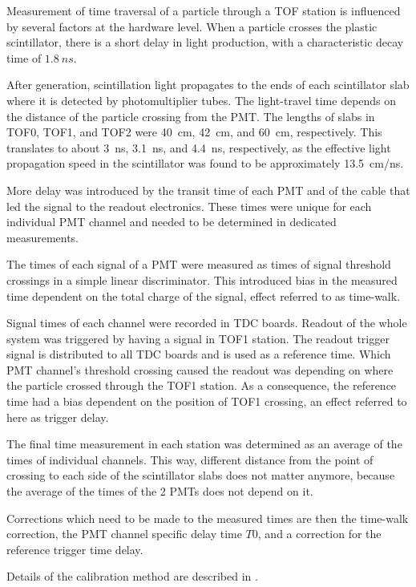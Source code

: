 Measurement of time traversal of a particle through a TOF station is
influenced by several factors at the hardware level. When a particle
crosses the plastic scintillator, there is a short delay in light
production, with a characteristic decay time of $1.8~ns$.

After generation, scintillation light propagates to the ends of each
scintillator slab where it is detected by photomultiplier tubes. The
light-travel time depends on the distance of the particle crossing
from the PMT. The lengths of slabs in TOF0, TOF1, and TOF2 were 40~cm,
42~cm, and 60~cm, respectively. This translates to about 3~ns, 3.1~ns,
and 4.4~ns, respectively, as the effective light propagation speed in
the scintillator was found to be approximately 13.5~cm/ns.

More delay was introduced by the transit time of each PMT and of the
cable that led the signal to the readout electronics. These times were
unique for each individual PMT channel and needed to be determined in
dedicated measurements.

The times of each signal of a PMT were measured as times of signal threshold
crossings in a simple linear discriminator. This introduced bias in
the measured time dependent on the total charge of the signal, effect
referred to as time-walk.

Signal times of each channel were recorded in TDC boards. Readout of
the whole system was triggered by having a signal in TOF1 station. The
readout trigger signal is distributed to all TDC boards and is used as
a reference time. Which PMT channel's threshold crossing caused the
readout was depending on where the particle crossed through the TOF1
station. As a consequence, the reference time had a bias dependent on
the position of TOF1 crossing, an effect referred to here as trigger
delay.

The final time measurement in each station was determined as an average of
the times of individual channels. This way, different distance from
the point of crossing to each side of the scintillator slabs does not
matter anymore, because the average of the times of the 2 PMTs does
not depend on it.

Corrections which need to be made to the measured times are then the
time-walk correction, the PMT channel specific delay time $T0$, and
a correction for the reference trigger time delay.

Details of the calibration method are described in \cite{NOTE251}.


